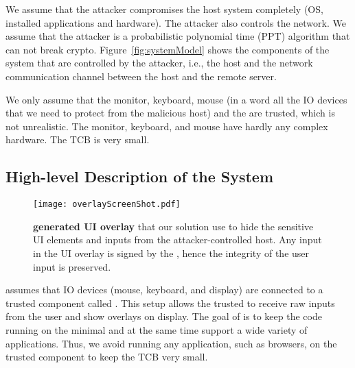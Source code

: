 We assume that the attacker compromises the host system completely (OS, installed applications and hardware). The attacker also controls the network. We assume that the attacker is a probabilistic polynomial time (PPT) algorithm that can not break crypto. Figure~\ref{fig:systemModel} shows the components of the system that are controlled by the attacker, i.e., the host and the network communication channel between the host and the remote server.

We only assume that the monitor, keyboard, mouse (in a word all the IO devices that we need to protect from the malicious host) and the \device are trusted, which is not unrealistic. The monitor, keyboard, and mouse have hardly any complex hardware. The TCB is very small.

\iffalse
\begin{figure}[t]
\centering
\texttt{[image: screenPartition.pdf]}
\caption{\textbf{\device's pointer tracking, pointer \& UI overlay, and security properties.} Our proposed method provides two layers of protection for IO to the user. 1. In all the parts of the screen, the \device provide pointer integrity (the gray part). 2. The green part of the screen where the \device overlays on the HDMI stream where the \device provide integrity and privacy (privacy is dependent on the application requirements) for the IO.}
\label{fig:screenPartition}
\centering
\end{figure}
\fi



\subsection{High-level Description of the System}

\begin{figure}[t]
\centering
\texttt{[image: overlayScreenShot.pdf]}
\caption{\textbf{\device generated UI overlay} that our solution use to hide the sensitive UI elements and inputs from the attacker-controlled host. Any input in the UI overlay is signed by the \device, hence the integrity of the user input is preserved.}
\label{fig:screenshot_1}
\centering
\end{figure}

 \name assumes that IO devices (mouse, keyboard, and display) are connected to a trusted component called \device. This setup allows the trusted \device to receive raw inputs from the user and show overlays on display. The goal of \name is to keep the code running on the \device minimal and at the same time support a wide variety of applications. Thus, we avoid running any application, such as browsers, on the trusted component to keep the TCB very small.

